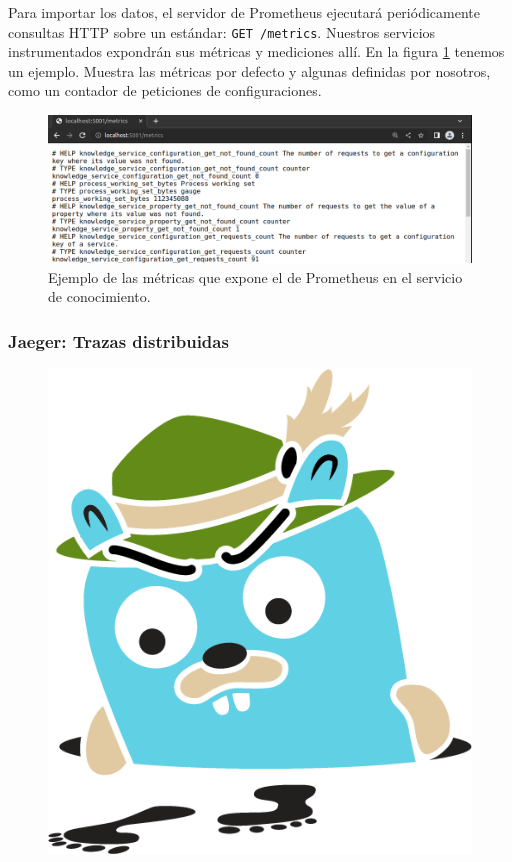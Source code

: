 Para importar los datos, el servidor de Prometheus ejecutará periódicamente consultas HTTP sobre un  estándar: \texttt{GET /metrics}. Nuestros servicios instrumentados expondrán sus métricas y mediciones allí. En la figura \ref{fig:prometheus-ejemplo-metricas} tenemos un ejemplo. Muestra las métricas por defecto y algunas definidas por nosotros, como un contador de peticiones de configuraciones.

\begin{figure}[htb]
  \centering
  \includegraphics[scale=1.65]{cap_despliegue/images/Prometheus-Metricas-Ejemplo}
  \caption{Ejemplo de las métricas que expone el  de Prometheus en el servicio de conocimiento.}
  \label{fig:prometheus-ejemplo-metricas}
\end{figure}

\subsubsection{Jaeger: Trazas distribuidas}

\begin{figure}
  \vspace{-20pt}
  \includegraphics[scale=0.12]{cap_despliegue/images/jaeger-logo-x}
  \vspace{-20pt}
\end{figure}

